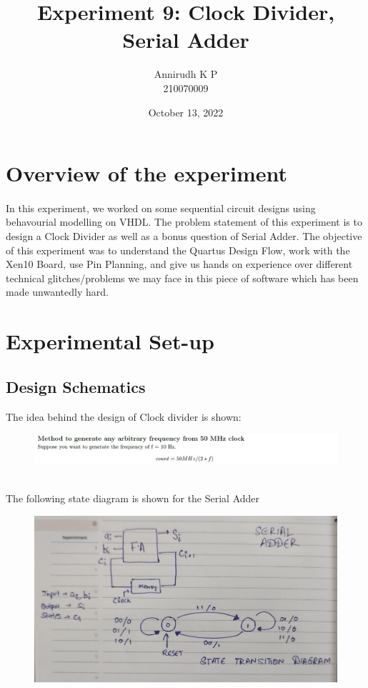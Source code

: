 \documentclass[12pt]{article}
\title{Experiment 9: Clock Divider, Serial Adder}
\author{Annirudh K P\\%
210070009}
\date{October 13, 2022}
\begin{document}
\maketitle

\section{Overview of the experiment}
\paragraph{}
In this experiment, we worked on some sequential circuit designs using behavourial modelling on VHDL. The problem statement of this experiment is to design a Clock Divider as well as a bonus question of Serial Adder. The objective of this experiment was to understand the Quartus Design Flow, work with the Xen10 Board, use Pin Planning, and give us hands on experience over different technical glitches/problems we may face in this piece of software which has been made unwantedly hard.

\section{Experimental Set-up}

\subsection{Design Schematics}
The idea behind the design of Clock divider is shown:

\begin{figure}[H]
\centering
  \includegraphics*[scale=0.7]{Images/ClockDiv_Design.jpeg}\
\end{figure}

The following state diagram is shown for the Serial Adder

\begin{figure}[H]
\centering
  \includegraphics[scale=0.3]{Images/SerialAdder_Design.jpeg}
  \caption{}
\end{figure}
\end{document}
